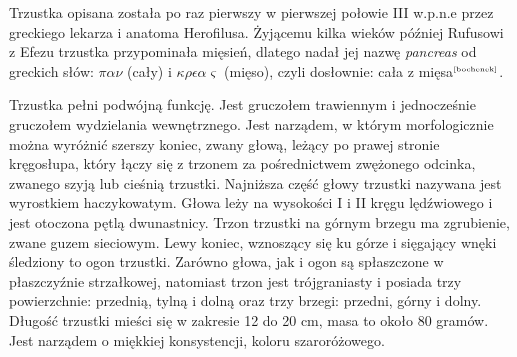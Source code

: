 \documentclass[a4paper, 12pt]{report}
\newcommand\cyt[1]{$^{\tiny{\cite{#1}}}$}
\begin{document}
Trzustka opisana została po raz pierwszy w pierwszej połowie III
w.p.n.e przez greckiego lekarza i anatoma Herofilusa. Żyjącemu kilka
wieków później Rufusowi z Efezu trzustka przypominała mięsień, dlatego
nadał jej nazwę \textsl{pancreas} od greckich słów: $\pi\alpha\nu$
(cały) i $\kappa\rho\epsilon\alpha\varsigma$ (mięso), czyli dosłownie:
cała z mięsa\cyt{bochenek}.

Trzustka pełni podwójną funkcję. Jest gruczołem trawiennym i
jednocześnie gruczołem wydzielania wewnętrznego. Jest narządem, w
którym morfologicznie można wyróżnić szerszy koniec, zwany głową,
leżący po prawej stronie kręgosłupa, który łączy się z trzonem za
pośrednictwem zwężonego odcinka, zwanego szyją lub cieśnią
trzustki. Najniższa część głowy trzustki nazywana jest wyrostkiem
haczykowatym. Głowa leży na wysokości I i II kręgu lędźwiowego i jest
otoczona pętlą dwunastnicy.  Trzon trzustki na górnym brzegu ma
zgrubienie, zwane guzem sieciowym. Lewy koniec, wznoszący się ku górze
i sięgający wnęki śledziony to ogon trzustki.  Zarówno głowa, jak i
ogon są spłaszczone w płaszczyźnie strzałkowej, natomiast trzon jest
trójgraniasty i posiada trzy powierzchnie: przednią, tylną i dolną
oraz trzy brzegi: przedni, górny i dolny.  Długość trzustki mieści się
w zakresie 12 do 20 cm, masa to około 80 gramów. Jest narządem o
miękkiej konsystencji, koloru szaroróżowego.
\end{document}

